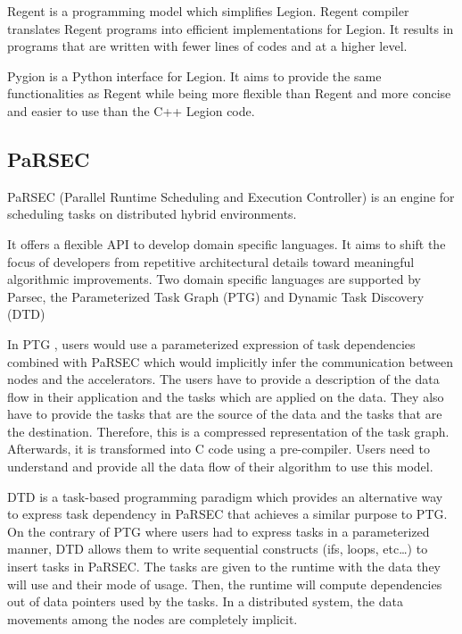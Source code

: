 Regent \cite{SLTBA2015} is a programming model which simplifies Legion.
Regent compiler translates Regent programs into efficient implementations for Legion.
It results in programs that are written with fewer lines of codes and at a higher level.

Pygion \cite{SlauA2019} is a Python interface for Legion.
It aims to provide the same functionalities as Regent while being more flexible than Regent and more concise and easier to use than the C++ Legion code.

\subsection{PaRSEC}
PaRSEC \cite{BBDHL2011} \cite{BBDFH2013} (Parallel Runtime Scheduling and Execution Controller) is an engine for scheduling tasks on distributed hybrid environments.

It offers a flexible API to develop domain specific languages.
It aims to shift the focus of developers from repetitive architectural details toward meaningful algorithmic improvements.
Two domain specific languages are supported by Parsec, the Parameterized Task Graph \cite{DBBHD2014} (PTG) and Dynamic Task Discovery \cite{HoHBD2017} (DTD)

In PTG \cite{DBBHD2014}, users would use a parameterized expression of task dependencies combined with PaRSEC which would implicitly infer the communication between nodes and the accelerators.
The users have to provide a description of the data flow in their application and the tasks which are applied on the data.
They also have to provide the tasks that are the source of the data and the tasks that are the destination.
Therefore, this is a compressed representation of the task graph.
Afterwards, it is transformed into C code using a pre-compiler.
Users need to understand and provide all the data flow of their algorithm to use this model.


DTD \cite{HoHBD2017} is a task-based programming paradigm which provides an alternative way to express task dependency in PaRSEC that achieves a similar purpose to PTG.
On the contrary of PTG where users had to express tasks in a parameterized manner, DTD allows them to write sequential constructs (ifs, loops, etc\dots) to insert tasks in PaRSEC.
The tasks are given to the runtime with the data they will use and their mode of usage.
Then, the runtime will compute dependencies out of data pointers used by the tasks.
In a distributed system, the data movements among the nodes are completely implicit.

